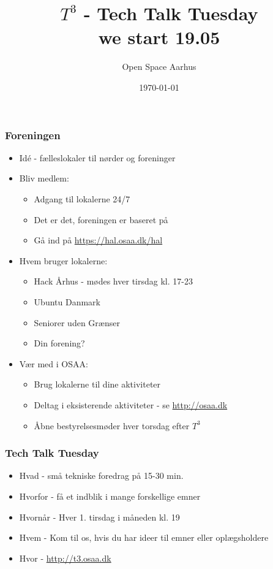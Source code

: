 \documentclass{beamer}
\title[${T^3}$ - Tech Talk Tuesday]{${T^3}$ - Tech Talk Tuesday \\
we start 19.05 }
\author{Open Space Aarhus}
\date{\today}
\institute[Bryggervej 30]{Bryggervej 30, 8240 Århus N}
\begin{document}
\begin{frame}[label=titlepage]
  \titlepage
\end{frame}

\begin{frame}
  \frametitle{Foreningen}
  \begin{itemize}
  \item Idé - fælleslokaler til nørder og foreninger
  \item Bliv medlem:
    \begin{itemize}
    \item Adgang til lokalerne 24/7
    \item Det er det, foreningen er baseret på
    \item Gå ind på  \url{https://hal.osaa.dk/hal}
    \end{itemize}
  \item Hvem bruger lokalerne:
    \begin{itemize}
    \item Hack Århus - mødes hver tirsdag kl. 17-23
    \item Ubuntu Danmark
    \item Seniorer uden Grænser
    \item Din forening?
    \end{itemize}
  \item Vær med i OSAA:
    \begin{itemize}
    \item Brug lokalerne til dine aktiviteter
    \item Deltag i eksisterende aktiviteter - se \url{http://osaa.dk}
    \item Åbne bestyrelsesmøder hver torsdag efter ${T^3}$
    \end{itemize}
  \end{itemize}						
\end{frame}

\begin{frame}
  \frametitle{Tech Talk Tuesday}
  \begin{itemize}		  
  \item Hvad - små tekniske foredrag på 15-30 min.
  \item Hvorfor - få et indblik i mange forskellige emner
  \item Hvornår - Hver 1. tirsdag i måneden kl. 19
  \item Hvem - Kom til os, hvis du har ideer til emner eller oplægsholdere
  \item Hvor - \url{http://t3.osaa.dk}
  \end{itemize}						
\end{frame}
\end{document}
